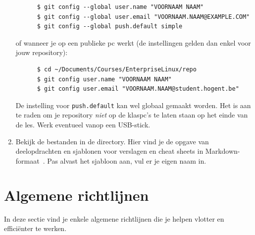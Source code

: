 \begin{enumerate}
    \begin{verbatim}
      $ git config --global user.name "VOORNAAM NAAM"
      $ git config --global user.email "VOORNAAM.NAAM@EXAMPLE.COM"
      $ git config --global push.default simple
    \end{verbatim}

    of wanneer je op een publieke pc werkt (de instellingen gelden dan enkel voor jouw repository):

    \begin{verbatim}
      $ cd ~/Documents/Courses/EnterpriseLinux/repo
      $ git config user.name "VOORNAAM NAAM"
      $ git config user.email "VOORNAAM.NAAM@student.hogent.be"
    \end{verbatim}

    De instelling voor \texttt{push.default} kan wel globaal gemaakt worden. Het is aan te raden om je repository \emph{niet} op de klaspc's te laten staan op het einde van de les. Werk eventueel vanop een USB-stick.

  \item Bekijk de bestanden in de  directory. Hier vind je de opgave van deelopdrachten en sjablonen voor verslagen en cheat sheets in Markdown-formaat~\autocite{Gruber2004}. Pas alvast het sjabloon aan, vul er je eigen naam in.
\end{enumerate}

\section{Algemene richtlijnen}
\label{sec:algemene_richtlijnen}

In deze sectie vind je enkele algemene richtlijnen die je helpen vlotter en efficiënter te werken.

